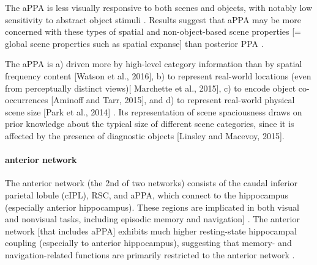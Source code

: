 \documentclass[english]{article}
\begin{document}
The aPPA is less visually responsive to both scenes and objects, with notably low sensitivity to abstract object
stimuli \citep{baldassano2013differential}.
%
Results suggest that aPPA may be more concerned with these types of spatial and
non-object-based scene properties [= global scene properties such as spatial
expanse] than posterior PPA \citep{baldassano2013differential}.

\citep{baldassano2016two} The aPPA is
a) driven more by high-level category information than by spatial frequency
content [Watson et al., 2016],
b) to represent real-world locations (even from perceptually distinct views)[
Marchette et al., 2015],
c) to encode object co-occurrences [Aminoff and Tarr, 2015], and
d) to represent real-world physical scene size [Park et al., 2014]
\citep{baldassano2016two}.
Its representation of scene spaciousness draws on prior knowledge about the
typical size of different scene categories, since it is affected by the presence
of diagnostic objects [Linsley and Macevoy, 2015]\citep{baldassano2016two}.


\paragraph{anterior network}

\citep{baldassano2016two} The anterior network (the 2nd of two networks)
consists of the caudal inferior parietal lobule (cIPL), RSC, and aPPA, which
connect to the hippocampus (especially anterior hippocampus). These regions are
implicated in both visual and nonvisual tasks, including episodic memory and
navigation] \citep{baldassano2016two}.
The anterior network [that includes aPPA] exhibits much higher resting-state
hippocampal coupling (especially to anterior hippocampus), suggesting that
memory- and navigation-related functions are primarily restricted to the
anterior network \citep{baldassano2016two}.
\end{document}

